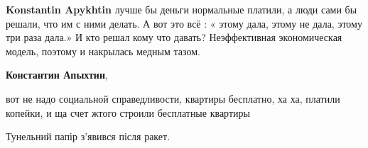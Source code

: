 \begin{itemize}
\begin{itemize}
\begin{itemize}
\textbf{Konstantin Apykhtin} лучше бы деньги нормальные платили, а люди сами бы решали, что им с ними делать. А вот это всё : « этому дала, этому не дала, этому три раза дала.» И кто решал кому что давать? Неэффективная экономическая модель, поэтому и накрылась медным тазом.

\textbf{Константин Апыхтин},

вот не надо социальной справедливости, квартиры бесплатно, ха ха, платили
копейки, и ща счет жтого строили бесплатные квартиры
\end{itemize} %

Тунельний папір з'явився після ракет.

\end{itemize} %

\end{itemize} %
